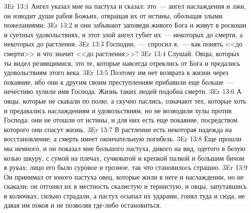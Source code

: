 \vs 3Er 13:1
Ангел указал мне на
пастуха и сказал: это~--- ангел наслаждения и лжи, он изводит души рабов Божьих,
отвращая их от истины, обольщая злыми пожеланиями;
\vs 3Er 13:2
и они забывают заповеди
живого Бога и живут в роскоши и суетных удовольствиях, и этот злой ангел губит
их~--- некоторых до смерти, а некоторых до растления.
\vs 3Er 13:3
Господин,~--- спросил я,~--- как понять <<до смерти>>
и что значит <<до растления>>?
\vs 3Er 13:4
Слушай. Овцы, которых ты
видел резвящимися, это те, которые навсегда отреклись от Бога и предались
удовольствиям этого века.
\vs 3Er 13:5
Поэтому им нет возврата к
жизни через покаяние, ибо они к другим своим преступлениям прибавили еще
больше~--- нечестиво хулили имя Господа. Жизнь таких людей подобна смерти.
\vs 3Er 13:6
А овцы, которые не скакали
по полю, а скучно паслись, означают тех, которые хоть и предавались
наслаждениям и удовольствиям, но не возводили хулы против Господа: они не
отошли от истины, и для них есть еще покаяние, посредством которого они спасут
жизнь.
\vs 3Er 13:7
В растлении есть некоторая
надежда на восстановление; а смерть имеет окончательную погибель.
\vs 3Er 13:8
Еще прошли мы немного, и
он показал мне большого пастуха, дикого на вид, одетого в белую козью шкуру, с
сумой на плечах, сучковатой и крепкой палкой и большим бичом в руках; лицо его
было суровое и грозное, так что становилось страшно.
\vs 3Er 13:9
Он принимал от юного
пастуха овец, которые жили в неге и наслаждении, но не скакали; он отгонял их
в местность скалистую и тернистую, и овцы, запутавшись в колючках, сильно
страдали, а пастух осыпал их ударами, гонял туда и сюда, не давая им покоя и
не позволяя где-либо остановиться.

